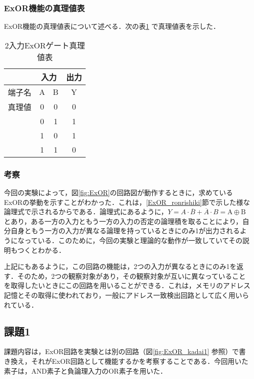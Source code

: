 %
%
\subsubsection{ExOR機能の真理値表}
\label{ExOR_shinrichi}
ExOR機能の真理値表について述べる．次の表\ref{tab:exor_shinritab} で真理値表を示した．
\begin {table}[ht]
	\begin {center}
		\caption {2入力ExORゲート真理値表}%
		\begin {tabular}{c|cc|c}\hline
			\multicolumn{1}{c|}{}&%
			\multicolumn{2}{c}{入力}&%
			\multicolumn{1}{|c}{出力}\\ %
			\hline
			\multicolumn{1}{c|}{端子名}&%
			\multicolumn{1}{c}{A}&%
			\multicolumn{1}{c}{B}&%
			\multicolumn{1}{|c}{Y}\\ %
			\hline
			真理値&0&0&0\\%
			&0&1&1\\%
			&1&0&1\\%
			&1&1&0\\
			\hline
		\end{tabular}
		\label {tab:exor_shinritab}%
	\end{center}
\end{table}
	
\subsubsection{考察}
\label{ExOR_consideration}
今回の実験によって，図\ref{fig:ExOR}の回路図が動作するときに，求めているExORの挙動を示すことがわかった．これは，\ref{ExOR_ronrishiki}節で示した様な論理式で示されるからである．論理式にあるように，$Y= A \cdot \overline{B} + \overline{A} \cdot B = \mathrm{A}\oplus \mathrm{B}$ とあり，ある一方の入力ともう一方の入力の否定の論理積を取ることにより，自分自身ともう一方の入力が異なる論理を持っているときにのみ1が出力されるようになっている．このために，今回の実験と理論的な動作が一致していてその説明もつくとわかる．

上記にもあるように，この回路の機能は，2つの入力が異なるときにのみ1を返す．そのため，2つの観察対象があり，その観察対象が互いに異なっていることを取得したいときにこの回路を用いることができる．これは，メモリのアドレス記憶とその取得に使われており，一般にアドレス一致検出回路として広く用いられている．
%
%
%
\subsection{課題1}
\label{ExOR_kadai1}
課題内容は，ExOR回路を実験とは別の回路（図\ref{fig:ExOR_kadai1} 参照）で書き換え，それがExOR回路として機能するかを考察することである．今回用いた素子は，AND素子と負論理入力のOR素子を用いた．

